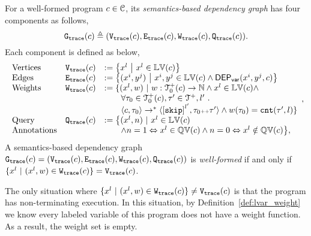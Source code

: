 \begin{defn}
\label{def:trace_graph}
For a well-formed program ${c} \in \mathcal{C}$,
its \emph{semantics-based dependency graph} has four components as follows,
\[
 \mathtt{{G_{trace}}}({c}) \triangleq (\mathtt{{V_{trace}}}({c}), \mathtt{{E_{trace}}}({c}), \mathtt{{W_{trace}}}({c}), \mathtt{{Q_{trace}}}({c})).
\]
Each component is defined as below,
{\small
\[
\begin{array}{lll}
 \text{Vertices} &
 \traceV({c}) & := \left\{ 
 x^l
 ~ \middle\vert ~ x^l \in \lvar(c)
 \right\}
 \\
 \text{Edges} &
 \traceE({c}) & := 
 \left\{ 
 (x^i, y^j) 
 ~ \middle\vert ~
 x^i, y^j \in \lvar(c) \land \vardep(x^i, y^j, c) 
 \right\}
 \\
 \text{Weights} &
 \traceW({c}) & := 
 \{ 
 (x^l, w) 
 ~ \vert ~ 
 w : \ftdom_0(c) \to \mathbb{N}
 \land
 x^l \in \lvar(c) \land
 \\ & & \qquad 
 \forall \trace_0 \in \ftdom_0(c), \trace' \in \ftdom, l' \st 
 \\ & & \qquad 
 \config{{c}, \trace_0} \to^{*} 
 \config{\clabel{\eskip}^{l'}, \trace_0 \tracecat \trace'} 
 \land w(\trace_0) = \vcounter(\trace', l) \} 
 \\
 \text{Query} &
 \traceF({c}) & := 
 \big\{(x^l, n) 
 ~ \vert ~ x^l \in \lvar(c) 
 \\ \text{Annotations} & & \qquad
 \land n = 1 \Leftrightarrow x^l \in \qvar(c) \land n = 0 \Leftrightarrow x^l \notin \qvar(c)
 \big\},
\end{array},
\]
}
A semantics-based dependency graph $\mathtt{{G_{trace}}}({c})= (\mathtt{{V_{trace}}}({c}), \mathtt{{E_{trace}}}({c}), \mathtt{{W_{trace}}}({c}), \mathtt{{Q_{trace}}}({c}))$ 
is \emph{well-formed} if and only if $ \{x^l \ |\ (x^l,w)\in \mathtt{{W_{trace}}}({c})\} = \mathtt{{V_{trace}}}({c}) $.
\end{defn}
The only situation where $ \{x^l \ |\ (x^l,w)\in \traceW({c})\} \neq \traceV({c}) $ is that the program
has non-terminating execution.
In this situation, by Definition~\ref{def:lvar_weight}  we know every labeled variable of this program does not have a weight function.
As a result, the weight set is empty.

